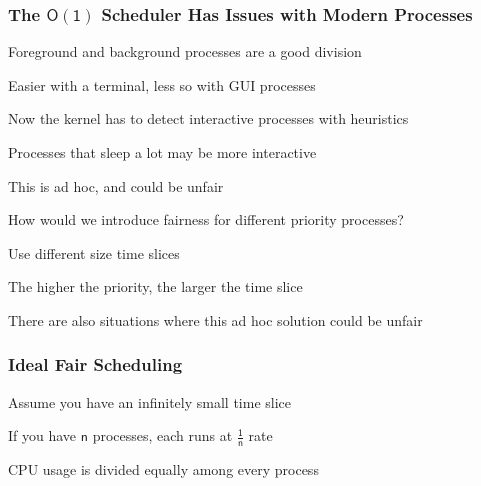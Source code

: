   \begin{frame}
    \frametitle{The $\mathsf{O(1)}$ Scheduler Has Issues with Modern Processes}

    Foreground and background processes are a good division

    \hspace{2em} Easier with a terminal, less so with GUI processes

    \vspace{2em}

    Now the kernel has to detect interactive processes with heuristics

    \hspace{2em} Processes that sleep a lot may be more interactive

    \hspace{4em} This is ad hoc, and could be unfair

    \vspace{2em}

    How would we introduce fairness for different priority processes?

    \hspace{2em} Use different size time slices

    \hspace{2em} The higher the priority, the larger the time slice

    \hspace{4em} There are also situations where this ad hoc solution could be unfair
  \end{frame}

  \begin{frame}
    \frametitle{Ideal Fair Scheduling}

    Assume you have an infinitely small time slice

    \hspace{2em} If you have $\mathsf{n}$ processes, each runs at $\mathsf{\frac{1}{n}}$ rate

    \vspace{2em}


    \vspace{2em} CPU usage is divided equally among every process
  \end{frame}

